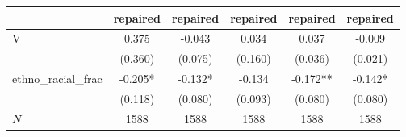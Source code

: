 {
\def\sym#1{\ifmmode^{#1}\else\(^{#1}\)\fi}
\begin{tabular}{l*{5}{c}}
\toprule
          &\multicolumn{1}{c}{repaired}&\multicolumn{1}{c}{repaired}&\multicolumn{1}{c}{repaired}&\multicolumn{1}{c}{repaired}&\multicolumn{1}{c}{repaired}\\
\midrule
V         &    0.375   &   -0.043   &    0.034   &    0.037   &   -0.009   \\
          &  (0.360)   &  (0.075)   &  (0.160)   &  (0.036)   &  (0.021)   \\
\addlinespace
ethno\_racial\_frac&   -0.205*  &   -0.132*  &   -0.134   &   -0.172** &   -0.142*  \\
          &  (0.118)   &  (0.080)   &  (0.093)   &  (0.080)   &  (0.080)   \\
\midrule
\(N\)     &     1588   &     1588   &     1588   &     1588   &     1588   \\
\bottomrule
\end{tabular}
}
